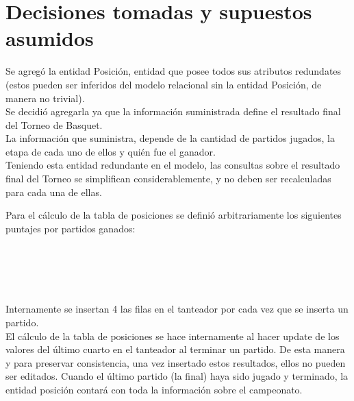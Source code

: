 \documentclass[11pt, a4paper, spanish]{article}
\begin{document}
{{{\newpage 
\section{Decisiones tomadas y supuestos asumidos}

	Se agreg\'o la entidad Posici\'on, entidad que posee todos sus atributos redundates (estos pueden ser inferidos del modelo relacional sin la entidad Posici\'on, de manera no trivial). \\
	Se decidi\'o agregarla ya que la informaci\'on suministrada define el resultado final del Torneo de Basquet.\\

La informaci\'on que suministra, depende de la cantidad de partidos jugados, la etapa de cada uno de ellos y qui\'en fue el ganador.\\

Teniendo esta entidad redundante en el modelo, las consultas sobre el resultado final del Torneo se simplifican considerablemente, y no deben ser recalculadas para cada una de ellas.

    Para el c\'alculo de la tabla de posiciones se defini\'o arbitrariamente los siguientes puntajes por partidos ganados:\\

\\
\\
\\
\\
\\

    Internamente se insertan 4 las filas en el tanteador por cada vez que se inserta un partido.\\

    El c\'alculo de la tabla de posiciones se hace internamente al hacer update de los valores del \'ultimo cuarto en el tanteador al terminar un partido. 
    De esta manera y para preservar consistencia, una vez insertado estos resultados, ellos no pueden ser editados. Cuando el \'ultimo partido (la final) haya sido jugado y terminado, la entidad posici\'on contar\'a con toda la informaci\'on sobre el campeonato.\\

}}}
\end{document}
